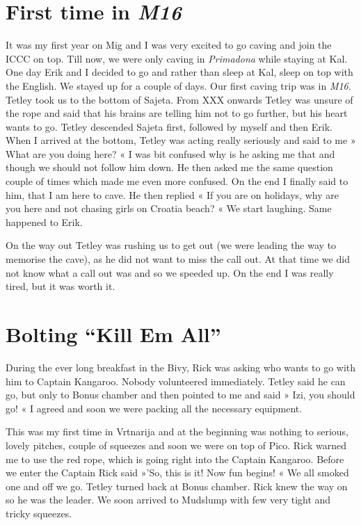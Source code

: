 
\hypertarget{first-time-in-m16}{%
\section{\texorpdfstring{First time in
\emph{M16}}{First time in M16}}\label{first-time-in-m16}}

It was my first year on Mig and I was very excited to go caving and join
the ICCC on top. Till now, we were only caving in \emph{Primadona} while
staying at Kal. One day Erik and I decided to go and rather than sleep
at Kal, sleep on top with the English. We stayed up for a couple of
days. Our first caving trip was in \emph{M16}. Tetley took us to the
bottom of Sajeta. From XXX onwards Tetley was unsure of the rope and
said that his brains are telling him not to go further, but his heart
wants to go. Tetley descended Sajeta first, followed by myself and then
Erik. When I arrived at the bottom, Tetley was acting really seriously
and said to me » What are you doing here? « I was bit confused why is he
asking me that and though we should not follow him down. He then asked
me the same question couple of times which made me even more confused.
On the end I finally said to him, that I am here to cave. He then
replied « If you are on holidays, why are you here and not chasing girls
on Croatia beach? « We start laughing. Same happened to Erik.

On the way out Tetley was rushing us to get out (we were leading the way
to memorise the cave), as he did not want to miss the call out. At that
time we did not know what a call out was and so we speeded up. On the
end I was really tired, but it was worth it.

\attrib{\izi}

\hypertarget{bolting-kill-em-all}{%
\section{Bolting ``Kill Em All''}\label{bolting-kill-em-all}}

During the ever long breakfast in the Bivy, Rick was asking who wants to
go with him to Captain Kangaroo. Nobody volunteered immediately. Tetley
said he can go, but only to Bonus chamber and then pointed to me and
said » Izi, you should go! « I agreed and soon we were packing all the
necessary equipment.

This was my first time in Vrtnarija and at the beginning was nothing to
serious, lovely pitches, couple of squeezes and soon we were on top of
Pico. Rick warned me to use the red rope, which is going right into the
Captain Kangaroo. Before we enter the Captain Rick said »'So, this is
it! Now fun begins! « We all smoked one and off we go. Tetley turned
back at Bonus chamber. Rick knew the way on so he was the leader. We
soon arrived to Mudslump with few very tight and tricky squeezes.

